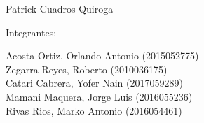 \documentclass[12pt,letterpaper]{article}
\begin{document}
\begin{titlepage}
\begin{center}
\vspace*{0.1in}
\begin{large}
 Patrick Cuadros Quiroga\\
\end{large}
\vspace*{0.2in}
\vspace*{0.1in}
\begin{large}
Integrantes: \\
\begin{flushleft}
Acosta Ortiz, Orlando Antonio                  \hfill	(2015052775) \\
Zegarra Reyes, Roberto  		            \hfill 	(2010036175) \\
Catari Cabrera, Yofer Nain 		\hfill 	(2017059289) \\
Mamani Maquera, Jorge Luis                   \hfill 	(2016055236) \\
Rivas Rios, Marko Antonio                       \hfill 	(2016054461) \\
\end{flushleft}
\end{large}
\end{center}

\end{titlepage}


\tableofcontents %
\thispagestyle{empty} %
\newpage
\setcounter{page}{1} %








\end{document}
